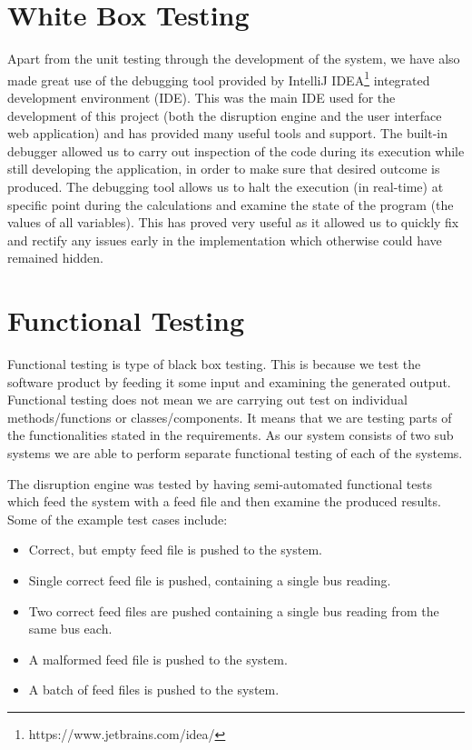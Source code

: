 \section{White Box Testing}
Apart from the unit testing through the development of the system, we have also made great use of the debugging tool provided by IntelliJ IDEA\footnote{https://www.jetbrains.com/idea/} integrated development environment (IDE). This was the main IDE used for the development of this project (both the disruption engine and the user interface web application) and has provided many useful tools and support. The built-in debugger allowed us to carry out inspection of the code during its execution while still developing the application, in order to make sure that desired outcome is produced. The debugging tool allows us to halt the execution (in real-time) at specific point during the calculations and examine the state of the program (the values of all variables). This has proved very useful as it allowed us to quickly fix and rectify any issues early in the implementation which otherwise could have remained hidden.

\section{Functional Testing}
Functional testing is type of black box testing. This is because we test the software product by feeding it some input and examining the generated output. Functional testing does not mean we are carrying out test on individual methods/functions or classes/components. It means that we are testing parts of the functionalities stated in the requirements. As our system consists of two sub systems we are able to perform separate functional testing of each of the systems.

The disruption engine was tested by having semi-automated functional tests which feed the system with a feed file and then examine the produced results. Some of the example test cases include:
\begin{itemize}
	\item Correct, but empty feed file is pushed to the system.
	\item Single correct feed file is pushed, containing a single bus reading.
	\item Two correct feed files are pushed containing a single bus reading from the same bus each.
	\item A malformed feed file is pushed to the system.
	\item A batch of feed files is pushed to the system.
\end{itemize}

